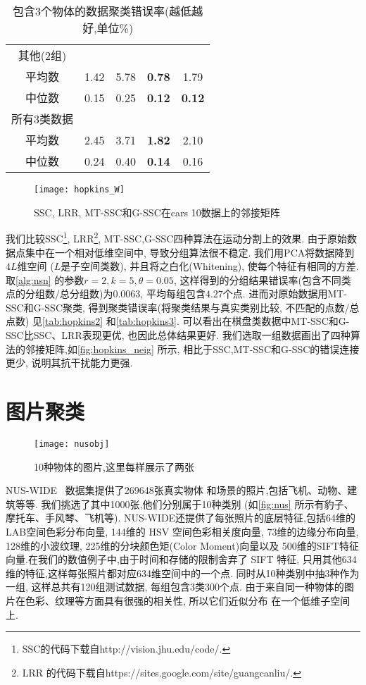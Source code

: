 \begin{table}[!htb]
\begin{tabular}{|c|c|c|c|c|}
	其他(2组)  &      &      &               &               \\
	平均数     & 1.42 & 5.78 & \textbf{0.78} & 1.79          \\
	中位数     & 0.15 & 0.25 & \textbf{0.12} & \textbf{0.12} \\ \hline
	所有3类数据  &      &      &               &               \\
	平均数     & 2.45 & 3.71 & \textbf{1.82} & 2.10 \\
    中位数     & 0.24 & 0.40 & \textbf{0.14}  & 0.16  \\ \hline
  \end{tabular}
  \caption{包含3个物体的数据聚类错误率(越低越好,单位\%)}
  \label{tab:hopkins3}
\end{table}

\begin{figure}[tb]
  \centering
  \texttt{[image: hopkins\_W]}
  \caption{SSC, LRR, MT-SSC和G-SSC在cars 10数据上的邻接矩阵}
  \label{fig:hopkins_neig}
\end{figure}
我们比较SSC\footnote{SSC的代码下载自http://vision.jhu.edu/code/.},
LRR\footnote{LRR 的代码下载自https://sites.google.com/site/guangcanliu/.},
MT-SSC,G-SSC四种算法在运动分割上的效果.
由于原始数据点集中在一个相对低维空间中, 导致分组算法很不稳定.
我们用PCA将数据降到\(4L\)维空间 (\(L\)是子空间类数), 并且将之白化(Whitening),
使每个特征有相同的方差. 
取\autoref{alg:nsn} 的参数\(r=2, k=5, \theta=0.05\),
这样得到的分组结果错误率(包含不同类点的分组数/总分组数)为\(0.0063\),
平均每组包含\(4.27\)个点.
进而对原始数据用MT-SSC和G-SSC聚类,
得到聚类错误率(将聚类结果与真实类别比较, 不匹配的点数/总点数)
见\autoref{tab:hopkins2} 和\autoref{tab:hopkins3}. 
可以看出在棋盘类数据中MT-SSC和G-SSC比SSC、LRR表现更优, 也因此总体结果更好.
我们选取一组数据画出了四种算法的邻接矩阵,如\autoref{fig:hopkins_neig} 所示,
相比于SSC,MT-SSC和G-SSC的错误连接更少, 说明其抗干扰能力更强.

\section{图片聚类}
\begin{figure}[htb]
  \centering
  \texttt{[image: nusobj]}
  \caption{10种物体的图片,这里每样展示了两张}
  \label{fig:nus}
\end{figure}
NUS-WIDE~\cite{chua2009nus} 数据集提供了269648张真实物体
和场景的照片,包括飞机、动物、建筑等等.
我们挑选了其中1000张,他们分别属于10种类别
(如\autoref{fig:nus} 所示有豹子、摩托车、手风琴、飞机等).
NUS-WIDE还提供了每张照片的底层特征,包括64维的LAB空间色彩分布向量,
144维的 HSV 空间色彩相关度向量, 73维的边缘分布向量,
128维的小波纹理, 225维的分块颜色矩(Color Moment)向量以及
500维的SIFT特征向量.在我们的数值例子中,由于时间和存储的限制舍弃了
SIFT 特征, 只用其他634维的特征,这样每张照片都对应634维空间中的一个点.
同时从10种类别中抽3种作为一组, 这样总共有120组测试数据, 每组包含3类300个点.
由于来自同一种物体的图片在色彩、纹理等方面具有很强的相关性, 所以它们近似分布
在一个低维子空间上.

